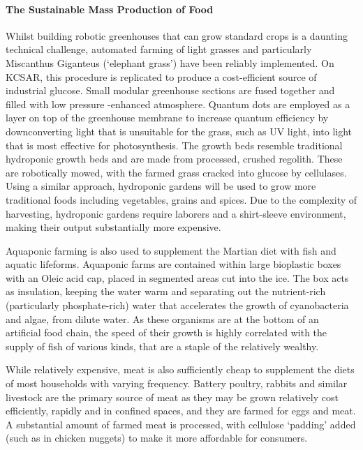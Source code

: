 \documentclass[fleqn,10pt]{Stylesheet} %
\begin{document}
\paragraph{The Sustainable Mass Production of Food}

Whilst building robotic greenhouses that can grow standard crops is a daunting technical challenge, automated farming of light grasses and particularly Miscanthus Giganteus (‘elephant grass’) have been reliably implemented. On KCSAR, this procedure is replicated to produce a cost-efficient source of industrial glucose. Small modular greenhouse sections are fused together and filled with low pressure -enhanced atmosphere. Quantum dots are employed as a layer on top of the greenhouse membrane to increase quantum efficiency by downconverting light that is unsuitable for the grass, such as UV light, into light that is most effective for photosynthesis. The growth beds resemble traditional hydroponic growth beds and are made from processed, crushed regolith. These are robotically mowed, with the farmed grass cracked into glucose by cellulases. Using a similar approach, hydroponic gardens will be used to grow more traditional foods including vegetables, grains and spices. Due to the complexity of harvesting, hydroponic gardens require laborers and a shirt-sleeve environment, making their output substantially more expensive.

Aquaponic farming is also used to supplement the Martian diet with fish and aquatic lifeforms. Aquaponic farms are contained within large bioplastic boxes with an Oleic acid cap, placed in segmented areas cut into the ice. The box acts as insulation, keeping the water warm and separating out the nutrient-rich (particularly phosphate-rich) water that accelerates the growth of cyanobacteria and algae, from dilute water. As these organisms are at the bottom of an artificial food chain, the speed of their growth is highly correlated with the supply of fish of various kinds, that are a staple of the relatively wealthy. 

While relatively expensive, meat is also sufficiently cheap to supplement the diets of most households with varying frequency. Battery poultry, rabbits and similar livestock are the primary source of meat as they may be grown relatively cost efficiently, rapidly and in confined spaces, and they are farmed for eggs and meat. A substantial amount of farmed meat is processed, with cellulose ‘padding’ added (such as in chicken nuggets) to make it more affordable for consumers. 
\end{document}
